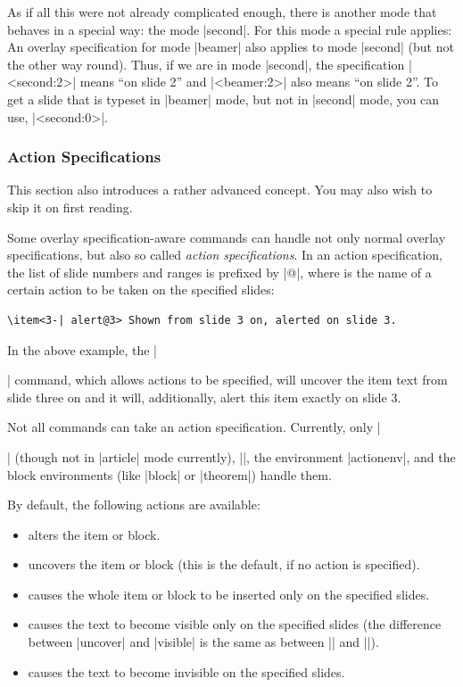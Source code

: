 \begin{original...}
As if all this were not already complicated enough, there is another mode that behaves in a special way: the mode |second|. For this mode a special rule applies: An overlay specification for mode |beamer| also applies to mode |second| (but not the other way round). Thus, if we are in mode |second|, the specification |<second:2>| means ``on slide 2'' and |<beamer:2>| also means ``on slide 2''. To get a slide that is typeset in |beamer| mode, but not in |second| mode, you can use, |<second:0>|.

\subsubsection{Action Specifications}
\label{section-action-specifications}

This section also introduces a rather advanced concept. You may also wish to skip it on first reading.

Some overlay specification-aware commands can handle not only normal overlay specifications, but also so called \emph{action specifications}. In an action specification, the list of slide numbers and ranges is prefixed by |@|, where  is the name of a certain action to be taken on the specified slides:
\begin{verbatim}
\item<3-| alert@3> Shown from slide 3 on, alerted on slide 3.
\end{verbatim}

In the above example, the |\item| command, which allows actions to be specified, will uncover the item text from slide three on and it will, additionally, alert this item exactly on slide 3.

Not all commands can take an action specification. Currently, only |\item| (though not in |article| mode currently), |\action|, the environment |actionenv|, and the block environments (like |block| or |theorem|) handle them.

By default, the following actions are available:
\begin{itemize}
\item {} alters the item or block.
\item {} uncovers the item or block (this is the default, if no action is specified).
\item {} causes the whole item or block to be inserted only on the specified slides.
\item {} causes the text to become visible only on the specified slides (the difference between |uncover| and |visible| is the same as between |\uncover| and |\visible|).
\item {} causes the text to become invisible on the specified slides.
\end{itemize}


\end{original...}
